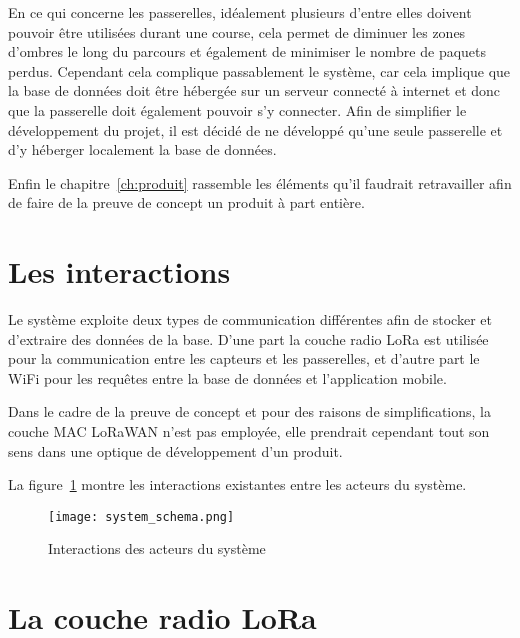 En ce qui concerne les passerelles, idéalement plusieurs d'entre elles doivent pouvoir être utilisées durant une course, cela permet de diminuer les zones d'ombres le long du parcours et également de minimiser le nombre de paquets perdus. Cependant cela complique passablement le système, car cela implique que la base de données doit être hébergée sur un serveur connecté à internet et donc que la passerelle doit également pouvoir s'y connecter. Afin de simplifier le développement du projet, il est décidé de ne développé qu'une seule passerelle et d'y héberger localement la base de données.

Enfin le chapitre~\ref{ch:produit} rassemble les éléments qu'il faudrait retravailler afin de faire de la preuve de concept un produit à part entière.

\section{Les interactions}

Le système exploite deux types de communication différentes afin de stocker et d'extraire des données de la base. D'une part la couche radio LoRa est utilisée pour la communication entre les capteurs et les passerelles, et d'autre part le WiFi pour les requêtes entre la base de données et l'application mobile. 

Dans le cadre de la preuve de concept et pour des raisons de simplifications, la couche MAC LoRaWAN n'est pas employée, elle prendrait cependant tout son sens dans une optique de développement d'un produit.

La figure~\ref{fig:system_schema} montre les interactions existantes entre les acteurs du système.

\begin{figure}[htb]
\centering 
\texttt{[image: system\_schema.png]} 
\caption{Interactions des acteurs du système}
\label{fig:system_schema}
\end{figure}

\section{La couche radio LoRa}

\todo{}



